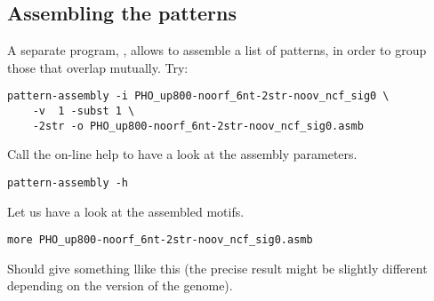 \subsection{Assembling the patterns}

A separate program, , allows to assemble a
list of patterns, in order to group those that overlap mutually. Try:

{\color{Blue} \begin{footnotesize} 
\begin{verbatim}
pattern-assembly -i PHO_up800-noorf_6nt-2str-noov_ncf_sig0 \
    -v  1 -subst 1 \
    -2str -o PHO_up800-noorf_6nt-2str-noov_ncf_sig0.asmb
\end{verbatim} \end{footnotesize}
}



Call the on-line help to have a look at the assembly parameters. 

{\color{Blue} \begin{footnotesize} 
\begin{verbatim}
pattern-assembly -h
\end{verbatim} \end{footnotesize}
}


Let us have a look at the assembled motifs.
 
{\color{Blue} \begin{footnotesize} 
\begin{verbatim}
more PHO_up800-noorf_6nt-2str-noov_ncf_sig0.asmb
\end{verbatim} \end{footnotesize}
}


Should give something llike this (the precise result might be slightly
different depending on the version of the genome).

